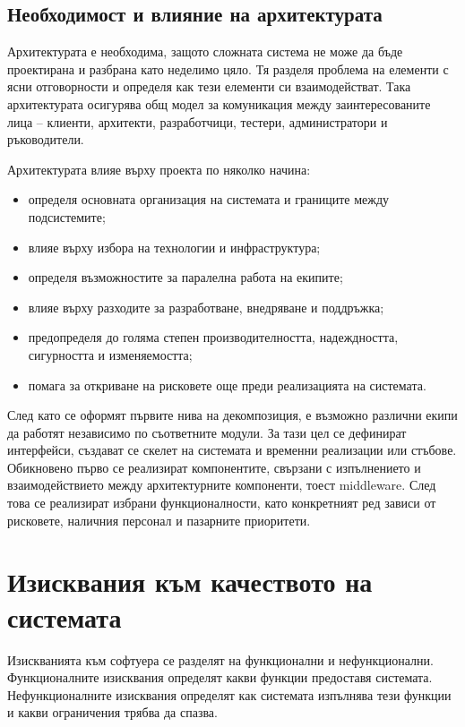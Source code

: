 \subsection{Необходимост и влияние на архитектурата}\label{s:27.1.2}

Архитектурата е необходима, защото сложната система не може да бъде проектирана и разбрана като неделимо цяло. Тя разделя проблема на елементи с ясни отговорности и определя как тези елементи си взаимодействат. Така архитектурата осигурява общ модел за комуникация между заинтересованите лица -- клиенти, архитекти, разработчици, тестери, администратори и ръководители.

Архитектурата влияе върху проекта по няколко начина:

\begin{itemize}
    \item определя основната организация на системата и границите между подсистемите;
    \item влияе върху избора на технологии и инфраструктура;
    \item определя възможностите за паралелна работа на екипите;
    \item влияе върху разходите за разработване, внедряване и поддръжка;
    \item предопределя до голяма степен производителността, надеждността, сигурността и изменяемостта;
    \item помага за откриване на рисковете още преди реализацията на системата.
\end{itemize}

След като се оформят първите нива на декомпозиция, е възможно различни екипи да работят независимо по съответните модули. За тази цел се дефинират интерфейси, създават се скелет на системата и временни реализации или стъбове. Обикновено първо се реализират компонентите, свързани с изпълнението и взаимодействието между архитектурните компоненти, тоест middleware. След това се реализират избрани функционалности, като конкретният ред зависи от рисковете, наличния персонал и пазарните приоритети.

\section{Изисквания към качеството на системата}\label{s:27.2}

\begin{defn}
Изискванията към софтуера се разделят на функционални и нефункционални. Функционалните изисквания определят какви функции предоставя системата. Нефункционалните изисквания определят как системата изпълнява тези функции и какви ограничения трябва да спазва.
\end{defn}

